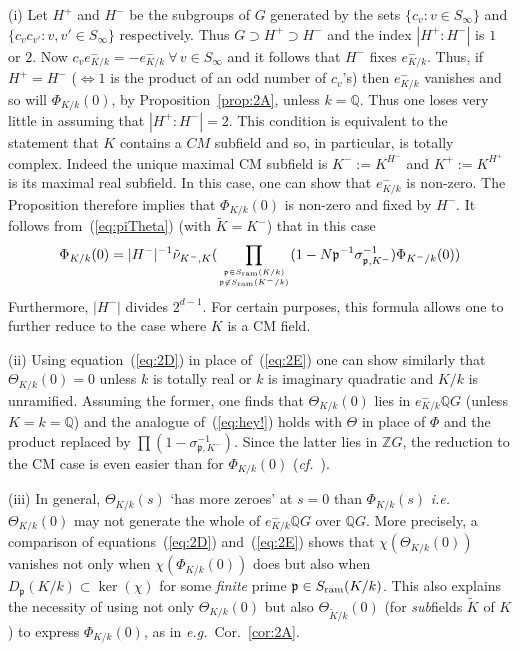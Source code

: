 \documentclass[12pt]{article}
\newcounter{rem}[section]%
\newcommand{\bbQ}{\ensuremath{\mathbb{Q}}}
\newcommand{\bbZ}{\ensuremath{\mathbb{Z}}}
\newcommand{\beql}[1]{\begin{equation}\label{#1}}
\newcommand{\cf}{\emph{cf.}}
\newcommand{\eeq}{\end{equation}}
\newcommand{\eg}{\emph{e.g.}}
\newcommand{\fp}{\ensuremath{\mathfrak{p}}}
\newcommand{\ie}{\emph{i.e.}}
\newcommand{\inv}{^{-1}}%
\newcommand{\nin}{\not\in}
\newcommand{\refeq}[1]{~(\ref{eq:#1})}
\newcommand{\rem}{\refstepcounter{rem}\noindent{\sc Remark \therem}}%
\renewcommand{\therem}{\thesection.\arabic{rem}}
\newcommand{\PhiKk}{\ensuremath{\Phi_{K/k}}}
\newcommand{\PhiKko}{\ensuremath{\Phi_{K/k}(0)}}
\newcommand{\tK}{\ensuremath{\tilde{K}}}
\newcommand{\ThetaKk}{\ensuremath{\Theta_{K/k}}}
\begin{document}
(i) Let $H^+$  and $H^-$ be the subgroups of $G$ generated by the sets
$\{c_v:v\in S_\infty\}$ and $\{c_vc_{v'}:v,v'\in S_\infty\}$ respectively.
Thus $G\supset H^+\supset H^-$ and the index $|H^+:H^-|$ is $1$ or $2$.
Now $c_ve^-_{K/k}=-e^-_{K/k}\ \forall\,v\in S_\infty$ and it follows that
$H^-$ fixes $e^-_{K/k}$. Thus, if $H^+=H^-$ ($\Leftrightarrow 1$ is the product of an
odd number of $c_v$'s) then $e^-_{K/k}$
vanishes and so will $\PhiKk(0)$, by Proposition~\ref{prop:2A}, unless $k=\bbQ$.
Thus one loses very little in assuming that $|H^+:H^-|=2$. This condition is equivalent
to the statement that $K$ contains a $CM$ subfield and so, in particular, is totally complex.
Indeed the unique maximal CM subfield is $K^-:=K^{H^-}$ and $K^+:=K^{H^+}$ is its
maximal real subfield. In this case, one can show that $e^-_{K/k}$ is non-zero.
The Proposition therefore implies that $\PhiKko$ is non-zero and fixed by $H^-$.
It follows from\refeq{piTheta} (with $\tilde{K}=K^-$) that in this case
\beql{eq:hey!}
\PhiKko=
|H^-|\inv\tilde{\nu}_{K^-,K}(
\prod_{\fp\in S_{\rm ram}(K/k)\atop \fp\nin S_{\rm ram}(K^-/k)}
(1-N\fp^{-1}\sigma_{\fp,K^-}\inv)
\Phi_{K^-/k}(0)
)
\eeq
Furthermore, $|H^-|$ divides $2^{d-1}$. For certain purposes, this
formula allows one to further reduce to the case where $K$ is a CM field.

(ii) Using equation\refeq{2D} in place of\refeq{2E} one can show similarly that
$\ThetaKk(0)=0$ unless $k$ is totally real or $k$ is imaginary quadratic and
$K/k$ is unramified. Assuming the former, one finds that $\ThetaKk(0)$ lies in
$e^-_{K/k}\bbQ G$ (unless $K=k=\bbQ$) and the analogue of\refeq{hey!} holds with
$\Theta$ in place of $\Phi$ and the product replaced by
$\prod(1-\sigma_{\fp,K^-}\inv)$. Since the latter lies in  $\bbZ G$, the reduction
to the CM case is even easier than for $\PhiKk(0)$ (\cf~\cite[Thm.~IV.5.2]{Tate}).

(iii) In general, $\Theta_{K/k}(s)$ `has more zeroes' at $s=0$ than
$\Phi_{K/k}(s)$ \ie\ $\ThetaKk(0)$ may not generate the whole of
$e^-_{K/k}\bbQ G$ over $\bbQ G$.
More precisely, a comparison of equations\refeq{2D} and\refeq{2E}
shows that $\chi(\Theta_{K/k}(0))$ vanishes
not only when $\chi(\PhiKko)$ does but also when
$D_{\fp}(K/k)\subset\ker(\chi)$ for some \emph{finite} prime
$\fp\in S_{\rm ram}(K/k)$.
This also explains the necessity of using not only $\Theta_{K/k}(0)$ but also
$\Theta_{\tK/k}(0)$ (for \emph{sub}fields $\tK$ of $K$) to express $\PhiKko$, as
in \eg\ Cor.~\ref{cor:2A}.
\end{document}
